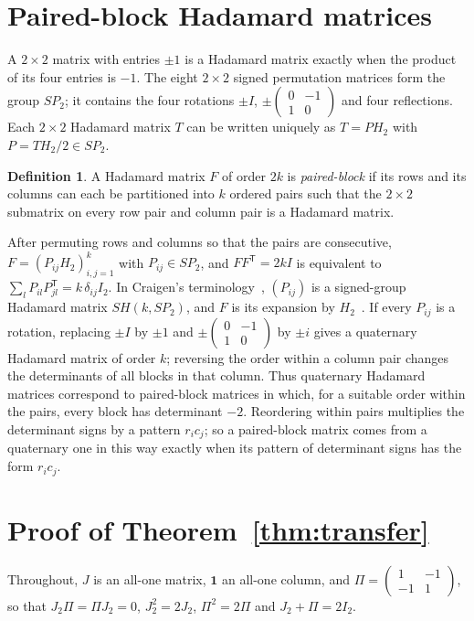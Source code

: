 \documentclass[10pt]{article}
\theoremstyle{definition}
\newtheorem{definition}[theorem]{Definition}
\theoremstyle{remark}
\newcommand{\tr}{^{\mathsf T}}
\newcommand{\one}{\mathbf 1}
\begin{document}
\section{Paired-block Hadamard matrices}\label{sec:pb}
A $2\times2$ matrix with entries $\pm1$ is a Hadamard matrix exactly when the product of its four entries is $-1$. The eight $2\times2$ signed permutation matrices form the group $SP_2$; it contains the four rotations $\pm I$, $\pm\left(\begin{smallmatrix}0&-1\\1&0\end{smallmatrix}\right)$ and four reflections. Each $2\times2$ Hadamard matrix $T$ can be written uniquely as $T=PH_2$ with $P=TH_2/2\in SP_2$.

\begin{definition}\label{def:paired}
A Hadamard matrix $F$ of order $2k$ is \emph{paired-block} if its rows and its columns can each be partitioned into $k$ ordered pairs such that the $2\times2$ submatrix on every row pair and column pair is a Hadamard matrix.
\end{definition}

After permuting rows and columns so that the pairs are consecutive, $F=(P_{ij}H_2)_{i,j=1}^k$ with $P_{ij}\in SP_2$, and $FF\tr=2kI$ is equivalent to $\sum_l P_{il}P_{jl}\tr=k\,\delta_{ij}I_2$. In Craigen's terminology~\cite{Cr95}, $(P_{ij})$ is a signed-group Hadamard matrix $SH(k,SP_2)$, and $F$ is its expansion by $H_2$~\cite[Theorem~5]{Cr95}. If every $P_{ij}$ is a rotation, replacing $\pm I$ by $\pm1$ and $\pm\left(\begin{smallmatrix}0&-1\\1&0\end{smallmatrix}\right)$ by $\pm i$ gives a quaternary Hadamard matrix of order $k$; reversing the order within a column pair changes the determinants of all blocks in that column. Thus quaternary Hadamard matrices correspond to paired-block matrices in which, for a suitable order within the pairs, every block has determinant $-2$. Reordering within pairs multiplies the determinant signs by a pattern $r_ic_j$; so a paired-block matrix comes from a quaternary one in this way exactly when its pattern of determinant signs has the form $r_ic_j$.

\section{Proof of Theorem~\ref{thm:transfer}}\label{sec:transfer}
Throughout, $J$ is an all-one matrix, $\one$ an all-one column, and $\Pi=\left(\begin{smallmatrix}1&-1\\-1&1\end{smallmatrix}\right)$, so that $J_2\Pi=\Pi J_2=0$, $J_2^2=2J_2$, $\Pi^2=2\Pi$ and $J_2+\Pi=2I_2$.
\end{document}
